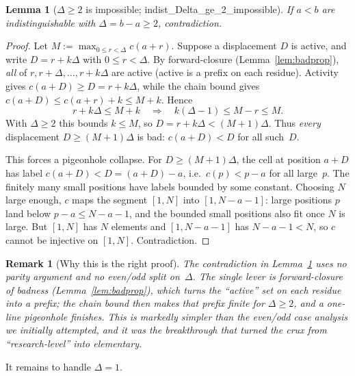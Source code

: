 \documentclass{article}
\newtheorem{lemma}[theorem]{Lemma}
\newtheorem{remark}[theorem]{Remark}
\newcommand{\us}{\discretionary{}{}{}\_\discretionary{}{}{}}
\newcommand{\lean}[1]{{\small\ttfamily #1}}
\begin{document}
\begin{lemma}[$\Delta\ge 2$ is impossible;
  \lean{indist\us Delta\us ge\us 2\us impossible}]\label{lem:Delta2}
If $a<b$ are indistinguishable with $\Delta=b-a\ge 2$, contradiction.
\end{lemma}
\begin{proof}
Let $M := \max_{0\le r<\Delta} c(a+r)$. Suppose a displacement $D$ is
active, and write $D=r+k\Delta$ with $0\le r<\Delta$. By forward-closure
(Lemma~\ref{lem:badprop}), \emph{all} of $r, r+\Delta, \dots, r+k\Delta$
are active (active is a prefix on each residue). Activity gives
$c(a+D)\ge D = r+k\Delta$, while the chain bound gives
$c(a+D)\le c(a+r)+k \le M+k$. Hence
\[
  r + k\Delta \le M + k
  \quad\Longrightarrow\quad
  k(\Delta-1) \le M - r \le M .
\]
With $\Delta\ge 2$ this bounds $k\le M$, so $D = r+k\Delta < (M{+}1)\Delta$.
Thus \emph{every} displacement $D \ge (M{+}1)\Delta$ is bad:
$c(a+D) < D$ for all such~$D$.

This forces a pigeonhole collapse. For $D \ge (M{+}1)\Delta$, the cell at
position $a+D$ has label $c(a+D) < D = (a+D) - a$, i.e.\ $c(p) < p-a$ for
all large~$p$. The finitely many small positions have labels bounded by
some constant. Choosing $N$ large enough, $c$ maps the segment $[1,N]$
into $[1, N-a-1]$: large positions $p$ land below $p-a \le N-a-1$, and
the bounded small positions also fit once $N$ is large. But $[1,N]$ has
$N$ elements and $[1, N-a-1]$ has $N-a-1 < N$, so $c$ cannot be injective
on $[1,N]$. Contradiction.
\end{proof}

\begin{remark}[Why this is the right proof]
The contradiction in Lemma~\ref{lem:Delta2} uses \emph{no} parity
argument and \emph{no} even/odd split on~$\Delta$. The single lever is
forward-closure of badness (Lemma~\ref{lem:badprop}), which turns the
``active'' set on each residue into a prefix; the chain bound then makes
that prefix finite for $\Delta\ge 2$, and a one-line pigeonhole finishes.
This is markedly simpler than the even/odd case analysis we initially
attempted, and it was the breakthrough that turned the crux from
``research-level'' into elementary.
\end{remark}

It remains to handle $\Delta=1$.
\end{document}
